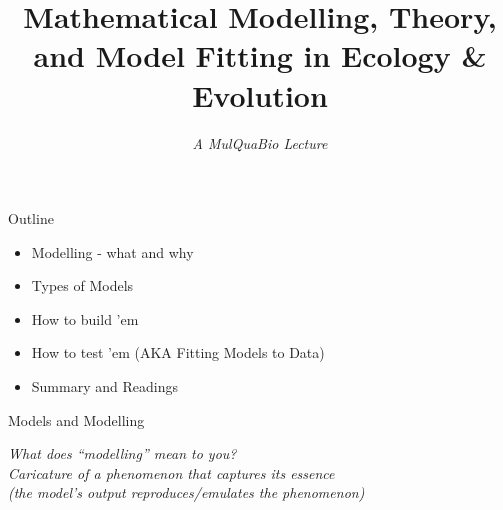 \documentclass[xcolor=x11names,compress]{beamer}
\title[EnE Modelling]{Mathematical Modelling, Theory, and Model Fitting in Ecology \& Evolution}
\subtitle{\it A MulQuaBio Lecture}
\renewcommand{\(}{\begin{columns}}
\renewcommand{\)}{\end{columns}}
\newcommand{\<}[1]{\begin{column}{#1}}
\renewcommand{\>}{\end{column}}
\begin{document}

\begin{frame}[plain]
	\titlepage
\end{frame}

\begin{frame}{Outline}
	\begin{itemize}\setlength{\itemindent}{0em}\itemsep12pt
  
	  \item Modelling - what and why
  
	  \item Types of Models
	  
	  \item How to build 'em
	  
	  \item How to test 'em (AKA Fitting Models to Data)

	  \item Summary and Readings
	  \end{itemize}  
  
  \end{frame}
  
\begin{frame}{Models and Modelling}

	\begin{center}

		\it What does ``modelling'' mean to you?\\
		\vspace{20pt}
		\pause 
		Caricature of a phenomenon that captures its essence \\ (the model's output reproduces/emulates the phenomenon)
		
	  \end{center}
 
 \end{frame}
\end{document}
